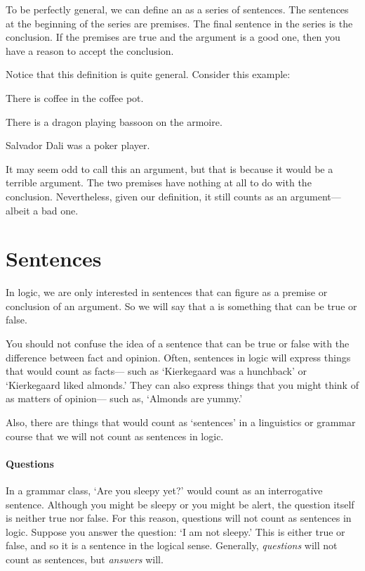 To be perfectly general, we can define an  as a series of sentences. The sentences at the beginning of the series are premises. The final sentence in the series is the conclusion. If the premises are true and the argument is a good one, then you have a reason to accept the conclusion.

Notice that this definition is quite general. Consider this example:
\begin{earg}
\item[] There is coffee in the coffee pot.
\item[] There is a dragon playing bassoon on the armoire.
\item[\therefore] Salvador Dali was a poker player.
\end{earg}
It may seem odd to call this an argument, but that is because it would be a {terrible} argument. The two premises have nothing at all to do with the conclusion. Nevertheless, given our definition, it still counts as an argument--- albeit a bad one.


\section{Sentences}
\label{intro.sentences}
In logic, we are only interested in sentences that can figure as a premise or conclusion of an argument. So we will say that a  is something that can be true or false.

You should not confuse the idea of a sentence that can be true or false with the difference between fact and opinion. Often, sentences in logic will express things that would count as facts--- such as `Kierkegaard was a hunchback' or `Kierkegaard liked almonds.' They can also express things that you might think of as matters of opinion--- such as, `Almonds are yummy.'

Also, there are things that would count as `sentences' in a linguistics or grammar course that we will not count as sentences in logic.

\paragraph{Questions} In a grammar class, `Are you sleepy yet?' would count as an interrogative sentence. Although you might be sleepy or you might be alert, the question itself is neither true nor false. For this reason, questions will not count as sentences in logic. Suppose you answer the question: `I am not sleepy.' This is either true or false, and so it is a sentence in the logical sense. Generally, \emph{questions} will not count as sentences, but \emph{answers} will.

